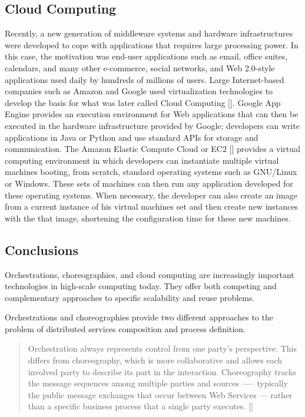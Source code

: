 \subsection{Cloud Computing}
Recently, a new generation of middleware systems and hardware infrastructures were developed to cope with applications that requires large processing power. In this case, the motivation was end-user applications such as email, office suites, calendars, and many other e-commerce, social networks, and Web 2.0-style applications used daily by hundreds of millions of users. Large Internet-based companies such as Amazon and Google used virtualization technologies to develop the basis for what was later called Cloud Computing [\citet{ZCB10}]. Google App Engine provides an execution environment for Web applications that can then be executed in the hardware infrastructure provided by Google; developers can write applications in Java or Python and use standard APIs for storage and communication.  The Amazon Elastic Compute Cloud or EC2 [\citet{EC2}] provides a virtual computing environment in which developers can instantiate multiple virtual machines booting, from scratch, standard operating systems such as GNU/Linux or Windows. These sets of machines can then run any application developed for these operating systems. When necessary, the developer can also create an image from a current instance of his virtual machines set and then create new instances with the that image, shortening the configuration time for these new machines.

\subsection{Conclusions}
Orchestrations, choreographies, and cloud computing are increasingly important technologies in high-scale computing today. They offer both competing and complementary approaches to specific scalability and reuse problems.

Orchestrations and choreographies provide two different approaches to the problem of distributed services composition and process definition.

\begin{quotation}
	Orchestration always represents control from one party’s perspective. This differs from choreography, which is more collaborative and allows each involved party to describe its part in the interaction. Choreography tracks the message sequences among multiple parties and sources —-- typically the public message exchanges that occur between Web Services --- rather than a specific business process that a single party executes. [\citet{WSOC}]
\end{quotation}

